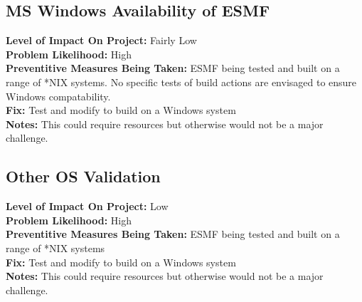\documentclass[english]{article}
\newcommand{\sreq}[1]{\subsection{\hspace{.2in}#1}}
\newenvironment
{reqlist}
{\begin{list} {} {} \rm \item[]}
{\end{list}}
\begin{document}
\sreq{MS Windows Availability of ESMF}
\begin{reqlist}
{\bf Level of Impact On Project:} Fairly Low \\
{\bf Problem Likelihood:} High \\
{\bf Preventitive Measures Being Taken:}  ESMF being tested and built on a range of *NIX systems.
No specific tests of build actions are envisaged to ensure Windows compatability.\\
{\bf Fix:} Test and modify to build on a Windows system\\
{\bf Notes:} This could require resources but otherwise would not be a major challenge.
\end{reqlist}

\sreq{Other OS Validation}
\begin{reqlist}
{\bf Level of Impact On Project:} Low \\
{\bf Problem Likelihood:} High \\
{\bf Preventitive Measures Being Taken:} ESMF being tested and built on a range of *NIX systems\\
{\bf Fix:}  Test and modify to build on a Windows system\\
{\bf Notes:} This could require resources but otherwise would not be a major challenge.
\end{reqlist}
\end{document}
